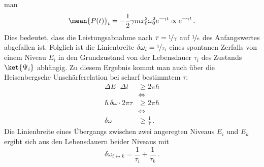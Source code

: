 man
\begin{equation}\label{eq:klassischer_oszillator_leistung_02}
	\mean{P(t)}_t=-\frac{1}{2}\gamma mx_0^2\omega_0^2\mathrm{e}^{-\gamma
	t}\propto\mathrm{e}^{-\gamma
	t}\,.
\end{equation}
Dies bedeutet, dass die Leistungsabnahme nach $\tau=\nicefrac{1}{\gamma}$ auf
$\nicefrac{1}{\mathrm{e}}$ des Anfangswertes abgefallen ist. Folglich ist die
Linienbreite $\delta\omega_i=\nicefrac{1}{\tau_i}$ eines spontanen Zerfalls von
einem Niveau $E_i$ in den Grundzustand von der Lebensdauer $\tau_i$ des
Zustands $\ket{\Psi_i}$ abhängig.
Zu diesem Ergebnis kommt man auch über die Heisenbergsche Unschärferelation bei scharf bestimmtem $\tau$:
\begin{equation}\label{eq:unschaerferelation}
	\begin{split}
		\Delta E\cdot\Delta t &\geq2\pi\hbar\\
		&\Leftrightarrow\\
		\hbar\,\delta\omega\cdot2\pi\tau &\geq2\pi\hbar\\
		&\Leftrightarrow\\
		\delta\omega &\geq\frac{1}{\tau}\,.
	\end{split}
\end{equation}
Die Linienbreite eines Übergangs zwischen
zwei angeregten Niveaus $E_i$ und $E_k$ ergibt sich aus den Lebensdauern beider Niveaus mit
\begin{equation}\label{eq:natuerliche_linienbreite_lebensdauern}
	\delta\omega_{i\leftrightarrow
	k}=\frac{1}{\tau_i}+\frac{1}{\tau_k}\,.
\end{equation}

